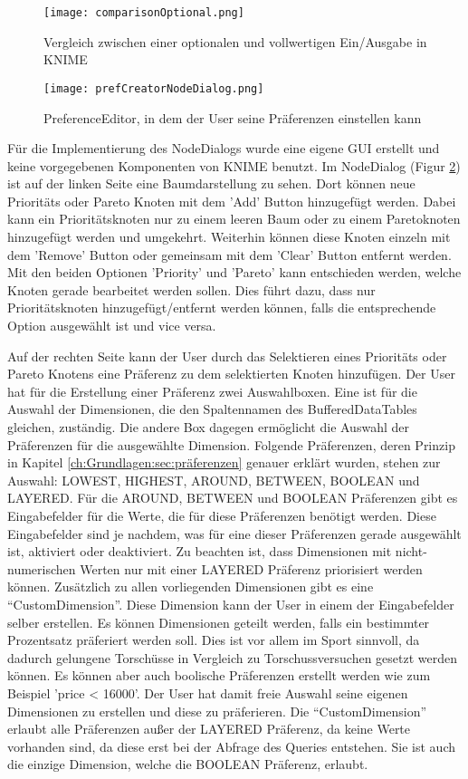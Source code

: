 \begin{figure}[H]
	\centering
	\texttt{[image: comparisonOptional.png]}
	\caption{Vergleich zwischen einer optionalen und vollwertigen Ein/Ausgabe in KNIME}
	\label{img:comparisonOptional}
\end{figure}

\begin{figure}[H]
	\centering
	\texttt{[image: prefCreatorNodeDialog.png]}
	\caption{PreferenceEditor, in dem der User seine Präferenzen einstellen kann}
	\label{img:prefCreatorNodeDialog}
\end{figure}

Für die Implementierung des NodeDialogs wurde eine eigene GUI erstellt und keine vorgegebenen Komponenten von KNIME benutzt. 
Im NodeDialog (Figur \ref{img:prefCreatorNodeDialog}) ist auf der linken Seite eine Baumdarstellung zu sehen. Dort können neue Prioritäts oder Pareto Knoten mit dem 'Add' Button hinzugefügt werden. Dabei kann ein Prioritätsknoten nur zu einem leeren Baum oder zu einem Paretoknoten hinzugefügt werden und umgekehrt. Weiterhin können diese Knoten einzeln mit dem 'Remove' Button oder gemeinsam mit dem 'Clear' Button entfernt werden. Mit den beiden Optionen 'Priority' und 'Pareto' kann entschieden werden, welche Knoten gerade bearbeitet werden sollen. Dies führt dazu, dass nur Prioritätsknoten hinzugefügt/entfernt werden können, falls die entsprechende Option ausgewählt ist und vice versa.

Auf der rechten Seite kann der User durch das Selektieren eines Prioritäts oder Pareto Knotens eine Präferenz zu dem selektierten Knoten hinzufügen. Der User hat für die Erstellung einer Präferenz zwei Auswahlboxen. Eine ist für die Auswahl der Dimensionen, die den Spaltennamen des BufferedDataTables gleichen, zuständig. Die andere Box dagegen ermöglicht die Auswahl der Präferenzen für die ausgewählte Dimension. Folgende Präferenzen, deren Prinzip in Kapitel \ref{ch:Grundlagen:sec:präferenzen} genauer erklärt wurden, stehen zur Auswahl: LOWEST, HIGHEST, AROUND, BETWEEN, BOOLEAN und LAYERED. Für die AROUND, BETWEEN und BOOLEAN Präferenzen gibt es Eingabefelder für die Werte, die für diese Präferenzen benötigt werden. Diese Eingabefelder sind je nachdem, was für eine dieser Präferenzen gerade ausgewählt ist, aktiviert oder deaktiviert. Zu beachten ist, dass Dimensionen mit nicht-numerischen Werten nur mit einer LAYERED Präferenz priorisiert werden können. 
Zusätzlich zu allen vorliegenden Dimensionen gibt es eine \enquote{CustomDimension}. Diese Dimension kann der User in einem der Eingabefelder selber erstellen. Es können Dimensionen geteilt werden, falls ein bestimmter Prozentsatz präferiert werden soll. Dies ist vor allem im Sport sinnvoll, da dadurch gelungene Torschüsse in Vergleich zu Torschussversuchen gesetzt werden können. Es können aber auch boolische Präferenzen erstellt werden wie zum Beispiel 'price < 16000'. Der User hat damit freie Auswahl seine eigenen Dimensionen zu erstellen und diese zu präferieren. Die \enquote{CustomDimension} erlaubt alle Präferenzen außer der LAYERED Präferenz, da keine Werte vorhanden sind, da diese erst bei der Abfrage des Queries entstehen. Sie ist auch die einzige Dimension, welche die BOOLEAN Präferenz, erlaubt. 

